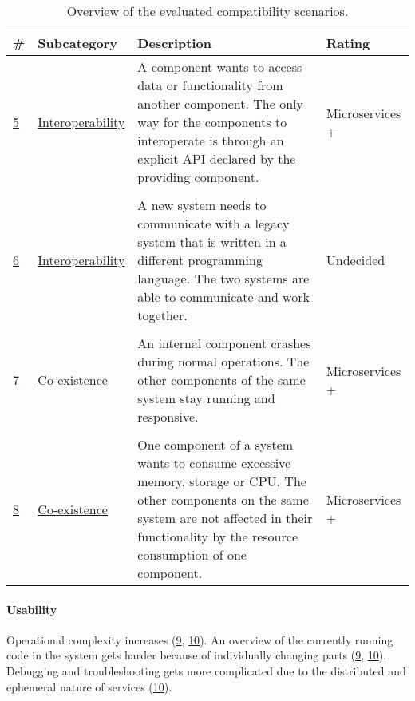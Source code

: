 \begin{table}[H]
  \renewcommand{\arraystretch}{1.2}
  \centering
  \sffamily
  \begin{footnotesize}
    \begin{tabular}{l l p{} p{}}
    \toprule
    \textbf{\#} & \textbf{Subcategory} & \textbf{Description}& \textbf{Rating} \\
    \midrule
				\hyperref[quaMicro:s5]{5} & \hyperref[quaMicro:s5]{Interoperability} & A component wants to access data or functionality from another component. The only way for the components to interoperate is through an explicit API declared by the providing component. & Microservices + \\ \\
				\hyperref[quaMicro:s6]{6} & \hyperref[quaMicro:s6]{Interoperability} & A new system needs to communicate with a legacy system that is written in a different programming language. The two systems are able to communicate and work together. & Undecided \\ \\
				\hyperref[quaMicro:s7]{7} & \hyperref[quaMicro:s7]{Co-existence} & An internal component crashes during normal operations. The other components of the same system stay running and responsive. & Microservices + \\ \\
				\hyperref[quaMicro:s8]{8} & \hyperref[quaMicro:s8]{Co-existence} & One component of a system wants to consume excessive memory, storage or CPU. The other components on the same system are not affected in their functionality by the resource consumption of one component. & Microservices + \\
    \bottomrule
    \end{tabular}
  \end{footnotesize}
  \rmfamily
  \caption[Overview of the evaluated compatibility scenarios.]{Overview of the evaluated compatibility scenarios.}
  \label{quaMicro:tableOverview}
\end{table}


\paragraph{Usability}
\begin{itemize}
\con Operational complexity increases (\hyperref[quaMicro:s9]{9}, \hyperref[quaMicro:s10]{10}).
\con An overview of the currently running code in the system gets harder because of individually changing parts  (\hyperref[quaMicro:s9]{9}, \hyperref[quaMicro:s10]{10}).
\con Debugging and troubleshooting gets more complicated due to the distributed and ephemeral nature of services  (\hyperref[quaMicro:s10]{10}).
\end{itemize}

